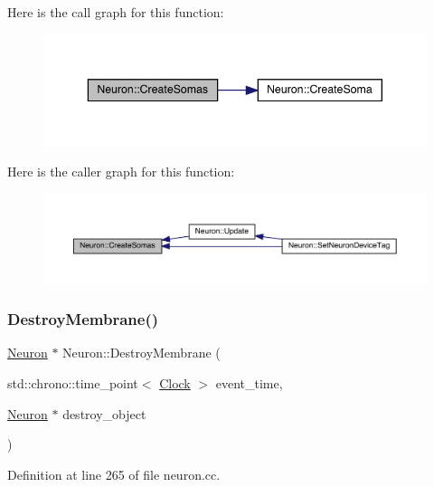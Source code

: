 Here is the call graph for this function\+:
\nopagebreak
\begin{figure}[H]
\begin{center}
\leavevmode
\includegraphics[width=343pt]{class_neuron_a2016d83b02bfe9e5548d5c24ef31dded_cgraph}
\end{center}
\end{figure}
Here is the caller graph for this function\+:
\nopagebreak
\begin{figure}[H]
\begin{center}
\leavevmode
\includegraphics[width=350pt]{class_neuron_a2016d83b02bfe9e5548d5c24ef31dded_icgraph}
\end{center}
\end{figure}
\mbox{\label{class_neuron_a127d1b915e976c63e731a94b7d27e0b1}} 
\subsubsection{\texorpdfstring{Destroy\+Membrane()}{DestroyMembrane()}}
{\footnotesize\ttfamily \hyperlink{class_neuron}{Neuron} $\ast$ Neuron\+::\+Destroy\+Membrane (\begin{DoxyParamCaption}\item[{std\+::chrono\+::time\+\_\+point$<$ \hyperlink{universe_8h_a0ef8d951d1ca5ab3cfaf7ab4c7a6fd80}{Clock} $>$}]{event\+\_\+time,  }\item[{\hyperlink{class_neuron}{Neuron} $\ast$}]{destroy\+\_\+object }\end{DoxyParamCaption})}



Definition at line 265 of file neuron.\+cc.

